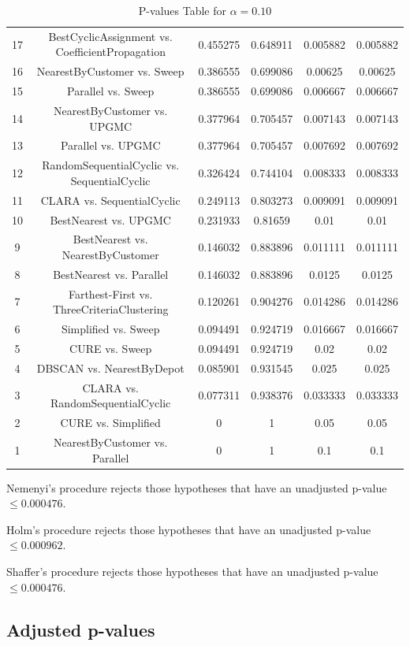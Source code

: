 \documentclass[a4paper,10pt]{article}
\begin{document}
\begin{landscape}
\begin{table}[!htp]
\begin{tabular}{cccccc}
17&BestCyclicAssignment vs. CoefficientPropagation&0.455275&0.648911&0.005882&0.005882\\
16&NearestByCustomer vs. Sweep&0.386555&0.699086&0.00625&0.00625\\
15&Parallel vs. Sweep&0.386555&0.699086&0.006667&0.006667\\
14&NearestByCustomer vs. UPGMC&0.377964&0.705457&0.007143&0.007143\\
13&Parallel vs. UPGMC&0.377964&0.705457&0.007692&0.007692\\
12&RandomSequentialCyclic vs. SequentialCyclic&0.326424&0.744104&0.008333&0.008333\\
11&CLARA vs. SequentialCyclic&0.249113&0.803273&0.009091&0.009091\\
10&BestNearest vs. UPGMC&0.231933&0.81659&0.01&0.01\\
9&BestNearest vs. NearestByCustomer&0.146032&0.883896&0.011111&0.011111\\
8&BestNearest vs. Parallel&0.146032&0.883896&0.0125&0.0125\\
7&Farthest-First vs. ThreeCriteriaClustering&0.120261&0.904276&0.014286&0.014286\\
6&Simplified vs. Sweep&0.094491&0.924719&0.016667&0.016667\\
5&CURE vs. Sweep&0.094491&0.924719&0.02&0.02\\
4&DBSCAN vs. NearestByDepot&0.085901&0.931545&0.025&0.025\\
3&CLARA vs. RandomSequentialCyclic&0.077311&0.938376&0.033333&0.033333\\
2&CURE vs. Simplified&0&1&0.05&0.05\\
1&NearestByCustomer vs. Parallel&0&1&0.1&0.1\\
\hline
\end{tabular}
\caption{P-values Table for $\alpha=0.10$}
\end{table}Nemenyi's procedure rejects those hypotheses that have an unadjusted p-value $\le0.000476$.

Holm's procedure rejects those hypotheses that have an unadjusted p-value $\le0.000962$.

Shaffer's procedure rejects those hypotheses that have an unadjusted p-value $\le0.000476$.

\pagebreak

\subsection{Adjusted p-values}


\end{landscape}
\end{document}
